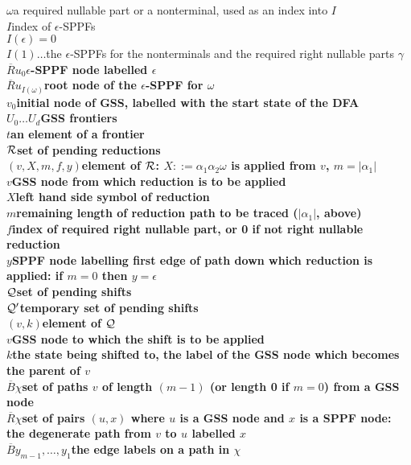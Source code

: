 \documentclass{article}
\newcommand{\NR}{\small\bf $\overline{R}$}
\newcommand{\NB}{\small\bf $\overline{B}$}
\begin{document}
\begin{tabbing}
\>$\omega$\>\>a required nullable part or a nonterminal, used as an index
into $I$\\
\>$I$\>\>index of $\epsilon$-SPPFs\\
\>\>$I(\epsilon) = 0$\\
\>\>$I(1)\ldots$\>the $\epsilon$-SPPFs for the nonterminals and the required right
nullable parts $\gamma$\\  
\NR\>\>$u_0$\>$\epsilon$-SPPF node labelled $\epsilon$\\
\NR\>\>$u_{I(\omega)}$\>root node of the $\epsilon$-SPPF for $\omega$\\[2ex]
\>$v_0$\>\>initial node of GSS, labelled with the start state of the DFA\\
\>$U_0 \ldots U_d$\>\>GSS frontiers\\
\>\>$t$\>an element of a frontier\\[2ex]
\>$\cal R$\>\>set of pending reductions\\
\>\>$(v,X,m,f,y)$\>element of $\cal R$: $X::=\alpha_1\alpha_2\omega$ is applied
from $v$, $m=|\alpha_1|$\\
\>\>$v$\>GSS node from which reduction is to be applied\\
\>\>$X$\>left hand side symbol of reduction\\
\>\>$m$\>remaining length of reduction path to be traced ($|\alpha_1|$, above)\\
\>\>$f$\>index of required right nullable part, or 0 if not right nullable reduction\\
\>\>$y$\>SPPF node labelling first edge of path down which reduction is
applied: if $m=0$ then $y=\epsilon$\\[2ex]
\>$\cal Q$\>\>set of pending shifts\\
\>$\cal Q'$\>\>temporary set of pending shifts\\
\>\>$(v,k)$\>element of $\cal Q$\\
\>\>$v$\>GSS node to which the shift is to be applied\\
\>\>$k$\>the state being shifted to, the label of the GSS node which
becomes the parent of $v$\\[2ex]
\NB\>$\chi$\>\>set of paths $v$ of length $(m-1)$ (or length 0 if $m=0$)
from a GSS node\\
\NR\>$\chi$\>\>set of pairs $(u,x)$ where $u$ is a GSS node and $x$ is a SPPF
node: the degenerate path from $v$ to $u$ labelled $x$\\
\NB\>\>$y_{m-1}, \dots, y_1$\>the edge labels on a path in $\chi$\\

\end{tabbing}
\end{document}
